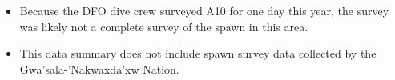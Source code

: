 \begin{itemize}
\item Because the DFO dive crew surveyed A10 for one day this year,
the survey was likely not a complete survey of the spawn in this area.
\item This data summary does not include spawn survey data collected by the
Gwa'sala-'Nakwaxda'xw Nation.
\end{itemize}